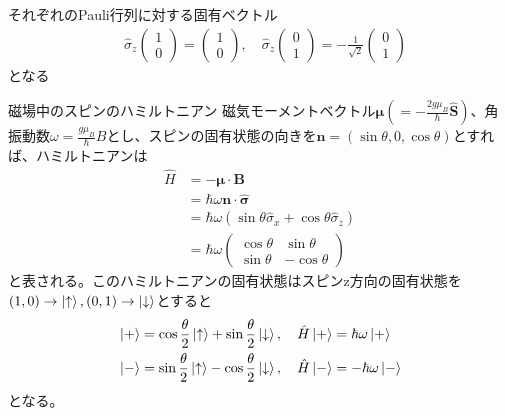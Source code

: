 \documentclass{jsarticle}  %
\numberwithin{equation}{section} %
\numberwithin{figure}{section}
\begin{document}
\begin{itembox}[l]{\large{それぞれのPauli行列に対する固有ベクトル}}
\begin{align}
            &\hat{\sigma}_z
            \left(
            \begin{matrix}
                1\\
                0
            \end{matrix}
            \right) = 
            \left(
            \begin{matrix}
                1\\
                0
            \end{matrix}
            \right),\quad
            \hat{\sigma}_z 
            \left(
            \begin{matrix}
                0\\
                1
            \end{matrix}
            \right) = -
            \frac{1}{\sqrt{2}}
            \left(
            \begin{matrix}
                0\\
                1
            \end{matrix}
            \right)
        \end{align}
        となる
    \end{itembox}
    \begin{itembox}[l]{\large{磁場中のスピンのハミルトニアン}}
        磁気モーメントベクトル$\bm{\mu}(=-\frac{2g \mu_B}{\hbar} \hat{\bm{S}})$、角振動数$\omega = \frac{g\mu_B}{\hbar}B$とし、スピンの固有状態の向きを$\bm{n}=(\sin \theta,0,\cos \theta)$とすれば、ハミルトニアンは
        \begin{align}
            \hat{H} &= -\bm{\mu}\cdot\bm{B} \\
            &= \hbar \omega \bm{n}\cdot \hat{\bm{\sigma}} \\
            &=\hbar \omega (\sin \theta \hat{\sigma}_x + \cos \theta \hat{\sigma}_z)\\
            &= \hbar \omega 
            \left(
            \begin{matrix}
                \cos \theta&\sin \theta\\
                \sin \theta&-\cos \theta
            \end{matrix}
            \right)
        \end{align}
        と表される。このハミルトニアンの固有状態はスピンz方向の固有状態を$(1,0)\rightarrow \ket{\uparrow},(0,1)\rightarrow \ket{\downarrow}$とすると
        \begin{align}
            &\ket{+} = \cos \frac{\theta}{2} \ket{\uparrow} + \sin \frac{\theta}{2} \ket{\downarrow},\quad \hat{H}\ket{+} = \hbar \omega \ket{+} \\
            &\ket{-} = \sin \frac{\theta}{2} \ket{\uparrow} - \cos \frac{\theta}{2} \ket{\downarrow},\quad \hat{H}\ket{-} = -\hbar \omega \ket{-} 
        \end{align}
        となる。
    \end{itembox}
\end{document}
